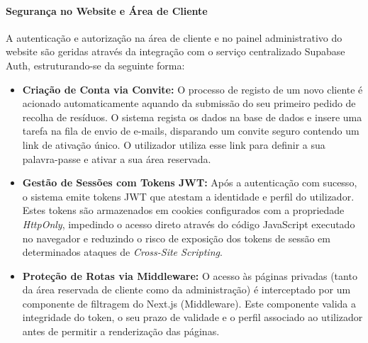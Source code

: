 \paragraph{Segurança no Website e Área de Cliente}
A autenticação e autorização na área de cliente e no painel administrativo do website são geridas através da integração com o serviço centralizado Supabase Auth, estruturando-se da seguinte forma:
\begin{itemize}
    \item \textbf{Criação de Conta via Convite:} O processo de registo de um novo cliente é acionado automaticamente aquando da submissão do seu primeiro pedido de recolha de resíduos. O sistema regista os dados na base de dados e insere uma tarefa na fila de envio de e-mails, disparando um convite seguro contendo um link de ativação único. O utilizador utiliza esse link para definir a sua palavra-passe e ativar a sua área reservada.
    \item \textbf{Gestão de Sessões com Tokens \ac{JWT}:} Após a autenticação com sucesso, o sistema emite tokens \ac{JWT} que atestam a identidade e perfil do utilizador. Estes tokens são armazenados em cookies configurados com a propriedade \textit{HttpOnly}, impedindo o acesso direto através do código JavaScript executado no navegador e reduzindo o risco de exposição dos tokens de sessão em determinados ataques de \textit{Cross-Site Scripting}.
    \item \textbf{Proteção de Rotas via Middleware:} O acesso às páginas privadas (tanto da área reservada de cliente como da administração) é interceptado por um componente de filtragem do Next.js (Middleware). Este componente valida a integridade do token, o seu prazo de validade e o perfil associado ao utilizador antes de permitir a renderização das páginas.
\end{itemize}

